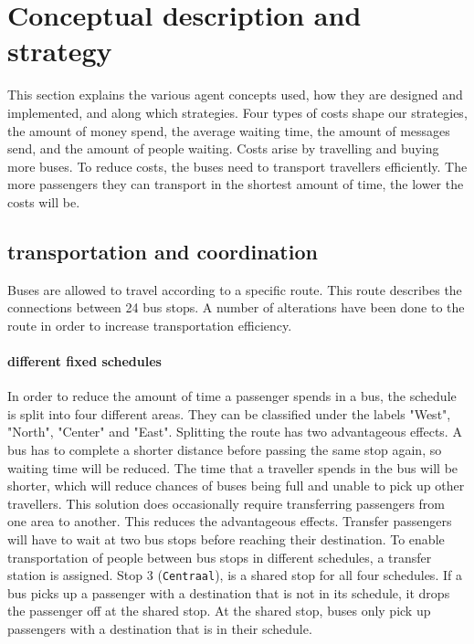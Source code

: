 \documentclass{article}
\begin{document}
\section{Conceptual description and strategy}
This section explains the various agent concepts used, how they are designed and implemented, and along which strategies. Four types of costs shape our strategies, the amount of money spend, the average waiting time, the amount of messages send, and the amount of people waiting. Costs arise by travelling and buying more buses. To reduce costs, the buses need to transport travellers efficiently. The more passengers they can transport in the shortest amount of time, the lower the costs will be.

\subsection{transportation and coordination}
Buses are allowed to travel according to a specific route. This route describes the connections between 24 bus stops. A number of alterations have been done to the route in order to increase transportation efficiency. 
\paragraph{different fixed schedules}
In order to reduce the amount of time a passenger spends in a bus, the schedule is split into four different areas. They can be classified under the labels "West", "North", "Center" and "East". Splitting the route has two advantageous effects. A bus has to complete a shorter distance before passing the same stop again, so waiting time will be reduced. The time that a traveller spends in the bus will be shorter, which will reduce chances of buses being full and unable to pick up other travellers.
\newline
This solution does occasionally require transferring passengers from one area to another. This reduces the advantageous effects. Transfer passengers will have to wait at two bus stops before reaching their destination. To enable transportation of people between bus stops in different schedules, a transfer station is assigned. Stop 3 (\texttt{Centraal}), is a shared stop for all four schedules. If a bus picks up a passenger with a destination that is not in its schedule, it drops the passenger off at the shared stop. At the shared stop, buses only pick up passengers with a destination that is in their schedule. 
\end{document}
